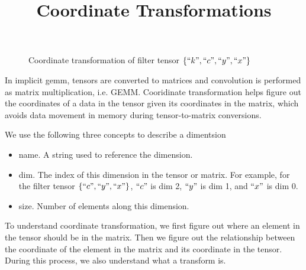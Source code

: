 



\title{Coordinate Transformations}

\maketitle

{}
\begin{figure}[!h]
  \centering
  \caption{Coordinate transformation of filter tensor $\{``k",``c",``y",``x"\}$}
  \label{fig:filter_tensor}
\end{figure}

In implicit gemm, tensors are converted to matrices and convolution
is performed as matrix multiplication, i.e. GEMM.
Cooridinate transformation helps figure out the coordinates of a data in the
tensor given its coordinates in the matrix, which avoids data movement in memory
during tensor-to-matrix conversions.

We use the following three concepts to describe a dimentsion
\begin{itemize}
\item name. A string used to reference the dimension.
\item dim. The index of this dimension in the tensor or matrix.
  For example, for the filter tensor $\{``c",``y",``x"\}$,
  $``c"$ is dim 2, $``y"$ is dim 1, and $``x"$ is dim 0.
\item size. Number of elements along this dimension.
\end{itemize}

To understand coordinate transformation, we first figure out where an element
in the tensor should be in the matrix.
Then we figure out the relationship between the coordinate of the element in the
matrix and its coordinate in the tensor.
During this process, we also understand what a transform is.


